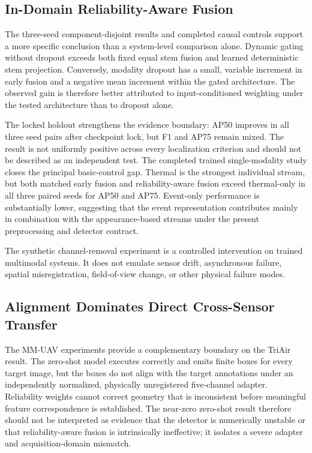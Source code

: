 \subsection{In-Domain Reliability-Aware Fusion}
The three-seed component-disjoint results and completed causal controls support a more specific conclusion than a system-level comparison alone. Dynamic gating without dropout exceeds both fixed equal stem fusion and learned deterministic stem projection. Conversely, modality dropout has a small, variable increment in early fusion and a negative mean increment within the gated architecture. The observed gain is therefore better attributed to input-conditioned weighting under the tested architecture than to dropout alone.

The locked holdout strengthens the evidence boundary: AP50 improves in all three seed pairs after checkpoint lock, but F1 and AP75 remain mixed. The result is not uniformly positive across every localization criterion and should not be described as an independent test. The completed trained single-modality study closes the principal basic-control gap. Thermal is the strongest individual stream, but both matched early fusion and reliability-aware fusion exceed thermal-only in all three paired seeds for AP50 and AP75. Event-only performance is substantially lower, suggesting that the event representation contributes mainly in combination with the appearance-based streams under the present preprocessing and detector contract.

The synthetic channel-removal experiment is a controlled intervention on trained multimodal systems. It does not emulate sensor drift, asynchronous failure, spatial misregistration, field-of-view change, or other physical failure modes.

\subsection{Alignment Dominates Direct Cross-Sensor Transfer}
The MM-UAV experiments provide a complementary boundary on the TriAir result. The zero-shot model executes correctly and emits finite boxes for every target image, but the boxes do not align with the target annotations under an independently normalized, physically unregistered five-channel adapter. Reliability weights cannot correct geometry that is inconsistent before meaningful feature correspondence is established. The near-zero zero-shot result therefore should not be interpreted as evidence that the detector is numerically unstable or that reliability-aware fusion is intrinsically ineffective; it isolates a severe adapter and acquisition-domain mismatch.

